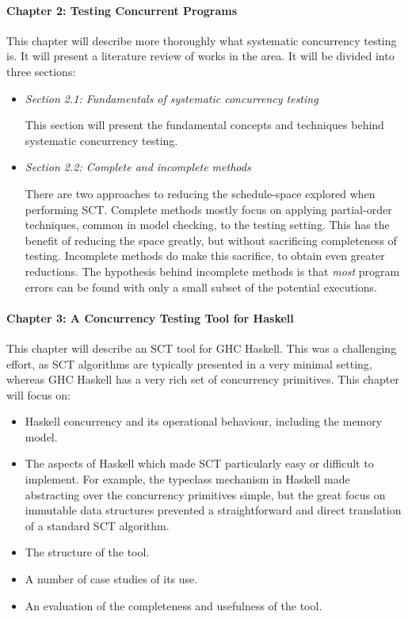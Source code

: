 \documentclass{article}
\begin{document}
\paragraph{Chapter 2: Testing Concurrent Programs} This chapter will
describe more thoroughly what systematic concurrency testing is. It
will present a literature review of works in the area. It will be
divided into three sections:

\begin{itemize}
\item \emph{Section 2.1: Fundamentals of systematic concurrency testing}

  This section will present the fundamental concepts and techniques
  behind systematic concurrency testing.

\item \emph{Section 2.2: Complete and incomplete methods}

  There are two approaches to reducing the schedule-space explored
  when performing SCT. Complete methods mostly focus on applying
  partial-order techniques, common in model checking, to the testing
  setting. This has the benefit of reducing the space greatly, but
  without sacrificing completeness of testing. Incomplete methods do
  make this sacrifice, to obtain even greater reductions. The
  hypothesis behind incomplete methods is that \emph{most} program
  errors can be found with only a small subset of the potential
  executions.
\end{itemize}

\paragraph{Chapter 3: A Concurrency Testing Tool for Haskell} This
chapter will describe an SCT tool for GHC Haskell\cite{walker2015}.
This was a challenging effort, as SCT algorithms are typically
presented in a very minimal setting, whereas GHC Haskell has a very
rich set of concurrency primitives. This chapter will focus on:

\begin{itemize}
\item Haskell concurrency and its operational behaviour, including the
  memory model.
\item The aspects of Haskell which made SCT particularly easy or
  difficult to implement. For example, the typeclass mechanism in
  Haskell made abstracting over the concurrency primitives simple, but
  the great focus on immutable data structures prevented a
  straightforward and direct translation of a standard SCT algorithm.
\item The structure of the tool.
\item A number of case studies of its use.
\item An evaluation of the completeness and usefulness of the tool.
\end{itemize}
\end{document}
